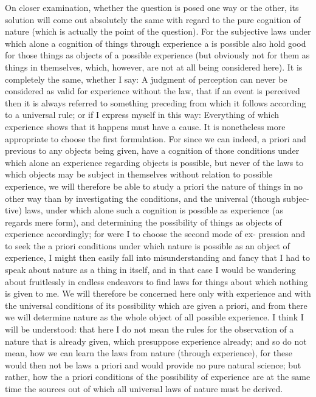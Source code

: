 On closer examination, whether the question is posed one way or the
other, its solution will come out absolutely the same with regard to the
pure cognition of nature (which is actually the point of the question).
For the subjective laws under which alone a cognition of things through
experience a is possible also hold good for those things as objects of a
possible experience (but obviously not for them as things in themselves,
which, however, are not at all being considered here). It is completely the
same, whether I say: A judgment of perception can never be considered as
valid for experience without the law, that if an event is perceived then it is
always referred to something preceding from which it follows according
to a universal rule; or if I express myself in this way: Everything of which
experience shows that it happens must have a cause.
It is nonetheless more appropriate to choose the ﬁrst formulation.
For since we can indeed, a priori and previous to any objects being given,
have a cognition of those conditions under which alone an experience
regarding objects is possible, but never of the laws to which objects may
be subject in themselves without relation to possible experience, we will
therefore be able to study a priori the nature of things in no other way
than by investigating the conditions, and the universal (though subjec-
tive) laws, under which alone such a cognition is possible as experience (as
regards mere form), and determining the possibility of things as objects
of experience accordingly; for were I to choose the second mode of ex-
pression and to seek the a priori conditions under which nature is possible
as an object of experience, I might then easily fall into misunderstanding
and fancy that I had to speak about nature as a thing in itself, and in that
case I would be wandering about fruitlessly in endless endeavors to ﬁnd
laws for things about which nothing is given to me.
We will therefore be concerned here only with experience and with
the universal conditions of its possibility which are given a priori, and
from there we will determine nature as the whole object of all possible
experience. I think I will be understood: that here I do not mean the rules
for the observation of a nature that is already given, which presuppose
experience already; and so do not mean, how we can learn the laws from
nature (through experience), for these would then not be laws a priori
and would provide no pure natural science; but rather, how the a priori
conditions of the possibility of experience are at the same time the sources
out of which all universal laws of nature must be derived.

